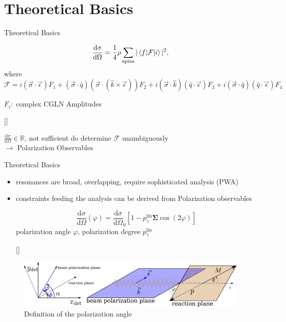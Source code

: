 \documentclass[11pt,aspectratio=169,dvipsnames]{beamer}
\newcommand{\thecolor}{black!70!blue}
\begin{document}
\section{Theoretical Basics}
\begin{frame}{Theoretical Basics}
\begin{tcolorbox}[colback=blue!5,colframe=\thecolor,title=Unpolarized differential cross section]

		$$\frac{\text{d}\sigma}{\text{d}\Omega}=\frac{1}{4}\rho\sum_{\text{spins}}|\braket{f|\mathcal{F}|i}|^2\\,$$
		where
		$$\mathcal{F}=i(\vec{\sigma}\cdot\vec{\epsilon})F_1+(\vec{\sigma}\cdot\hat{q})(\vec{\sigma}\cdot(\hat{k}\times\vec{\epsilon}))F_2+i(\vec{\sigma}\cdot\hat{k})(\hat{q}\cdot\vec{\epsilon})F_3+i(\vec{\sigma}\cdot\hat{q})(\hat{q}\cdot\vec{\epsilon})F_4$$
		\begin{flushright}
			$F_i:$ complex CGLN Amplitudes
		\end{flushright}

	
	\begin{flushright}
		{\scriptsize[\cite{cgln}]}
	\end{flushright}
\end{tcolorbox}
$\frac{\text{d}\sigma}{\text{d}\Omega}\in\mathbb{R}$, not sufficient do determine $\mathcal{F}$ unambiguously\\
$\rightarrow$ Polarization Observables
\end{frame}
\begin{frame}{Theoretical Basics}
	\begin{itemize}
		\item resonances are broad, overlapping, require sophisticated analysis (PWA)
		\item constraints feeding the analysis can be derived from Polarization observables
		\begin{tcolorbox}[colback=blue!5,colframe=\thecolor,title=Beam asymmetry $\boldsymbol{\Sigma}$]
			$$\frac{\text{d}\sigma}{\text{d}\Omega}(\varphi)=\frac{\text{d}\sigma}{\text{d}\Omega}_0\left[1-p_\gamma^{\text{lin}}\boldsymbol{\Sigma}\cos(2\varphi)\right]$$
			polarization angle $\varphi$, polarization degree $p_\gamma^{\text{lin}}$
			\begin{flushright}
				{}
			\end{flushright}
		\end{tcolorbox}
	\end{itemize}
\begin{figure}
	\centering
	\includegraphics[width=.8\linewidth]{angles.pdf}
	\caption*{Definition of the polarization angle}
\end{figure}
\end{frame}
\end{document}
